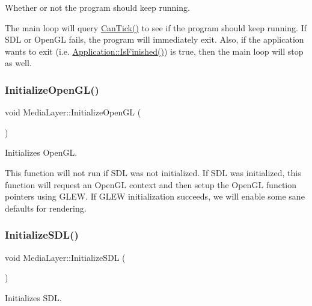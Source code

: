 Whether or not the program should keep running.

The main loop will query \hyperlink{class_media_layer_a023b4033ca8a44d25c6e37a0ff4178e8}{Can\+Tick()} to see if the program should keep running. If S\+DL or Open\+GL fails, the program will immediately exit. Also, if the application wants to exit (i.\+e. \hyperlink{class_application_a454a1d926759c4bfac47e730570a7743}{Application\+::\+Is\+Finished()}) is true, then the main loop will stop as well. \hypertarget{class_media_layer_abb3502cb44e707538741f55f5fe81361}{}\label{class_media_layer_abb3502cb44e707538741f55f5fe81361}
\subsubsection{\texorpdfstring{Initialize\+Open\+G\+L()}{InitializeOpenGL()}}
{\footnotesize\ttfamily void Media\+Layer\+::\+Initialize\+Open\+GL (\begin{DoxyParamCaption}{ }\end{DoxyParamCaption})\hspace{0.3cm}{\ttfamily [private]}}



Initializes Open\+GL.

This function will not run if S\+DL was not initialized. If S\+DL was initialized, this function will request an Open\+GL context and then setup the Open\+GL function pointers using G\+L\+EW. If G\+L\+EW initialization succeeds, we will enable some sane defaults for rendering. \hypertarget{class_media_layer_ad72130dbe963e351d5749a7f48b4ef97}{}\label{class_media_layer_ad72130dbe963e351d5749a7f48b4ef97}
\subsubsection{\texorpdfstring{Initialize\+S\+D\+L()}{InitializeSDL()}}
{\footnotesize\ttfamily void Media\+Layer\+::\+Initialize\+S\+DL (\begin{DoxyParamCaption}{ }\end{DoxyParamCaption})\hspace{0.3cm}{\ttfamily [private]}}



Initializes S\+DL.

